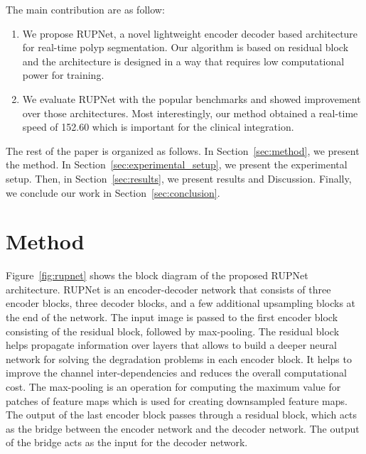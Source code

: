 \documentclass{article}
\begin{document}
The main contribution are as follow:
\begin{enumerate}
\item We propose RUPNet, a novel lightweight encoder decoder based architecture for real-time polyp segmentation. Our algorithm is based on residual block and the architecture is designed in a way that requires low computational power for training.  

\item We evaluate RUPNet with the popular benchmarks and showed improvement over those architectures. Most interestingly, our method obtained a real-time speed of 152.60 which is important for the clinical integration. 
\end{enumerate}

\vspace{5 mm}

The rest of the paper is organized as follows. In Section~\ref{sec:method}, we present the method. In Section~\ref{sec:experimental_setup}, we present the experimental setup. Then, in Section~\ref{sec:results}, we present results and Discussion. Finally, we conclude our work in Section~\ref{sec:conclusion}. 


\vspace{3mm}
\section{Method}
\vspace{3mm}
\label{sec:method}
Figure~\ref{fig:rupnet} shows the block diagram of the proposed RUPNet architecture. RUPNet is an encoder-decoder network that consists of three encoder blocks, three decoder blocks, and a few additional upsampling blocks at the end of the network. The input image is passed to the first encoder block consisting of the residual block, followed by  max-pooling. The residual block~\cite{he2016deep} helps propagate information over layers that allows to build a deeper neural network for solving the degradation problems in each encoder block. It helps to improve the channel inter-dependencies and reduces the overall computational cost. The max-pooling is an operation for computing the maximum value for patches of feature maps which is used for creating downsampled feature maps. The output of the last encoder block passes through a residual block, which acts as the bridge between the encoder network and the decoder network. The output of the bridge acts as the input for the decoder network. 
\end{document}
